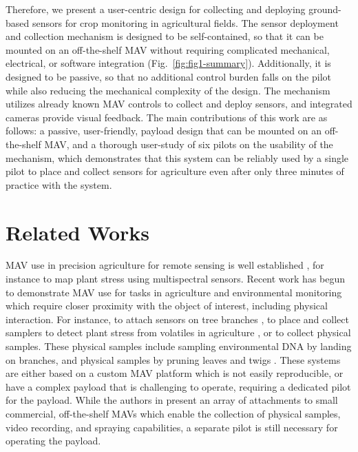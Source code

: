 Therefore, we present a user-centric design for collecting and deploying ground-based sensors for crop monitoring in agricultural fields. The sensor deployment and collection mechanism is designed to be self-contained, so that it can be mounted on an off-the-shelf \ac{MAV} without requiring complicated mechanical, electrical, or software integration (Fig.~\ref{fig:fig1-summary}). Additionally, it is designed to be passive, so that no additional control burden falls on the pilot while also reducing the mechanical complexity of the design. The mechanism utilizes already known \ac{MAV} controls to collect and deploy sensors, and integrated cameras provide visual feedback. The main contributions of this work are as follows: a passive, user-friendly, payload design that can be mounted on an off-the-shelf \ac{MAV}, and a thorough user-study of six pilots on the usability of the mechanism, which demonstrates that this system can be reliably used by a single pilot to place and collect sensors for agriculture even after only three minutes of practice with the system. 

\section{Related Works}

\ac{MAV} use in precision agriculture for remote sensing is well established \cite{Zhang2022, Manfreda2018}, for instance to map plant stress using multispectral sensors. Recent work has begun to demonstrate \ac{MAV} use for tasks in agriculture and environmental monitoring which require closer proximity with the object of interest, including physical interaction. For instance, to attach sensors on tree branches \cite{Geckeler2022a, Geckeler2023BiodegradableBranches, Hamaza}, to place and collect samplers to detect plant stress from volatiles in agriculture \cite{Geckeler2023a}, or to collect physical samples. These physical samples include sampling environmental DNA by landing on branches\cite{Aucone2023a}, and physical samples by pruning leaves and twigs \cite{Kaslin2018, Charron2020, LaVigne2022, Krisanski2022}. These systems are either based on a custom \ac{MAV} platform which is not easily reproducible, or have a complex payload that is challenging to operate, requiring a dedicated pilot for the payload. While the authors in \cite{Krasylenko2023DruidManagement} present an array of attachments to small commercial, off-the-shelf \acp{MAV} which enable the collection of physical samples, video recording, and spraying capabilities, a separate pilot is still necessary for operating the payload.

